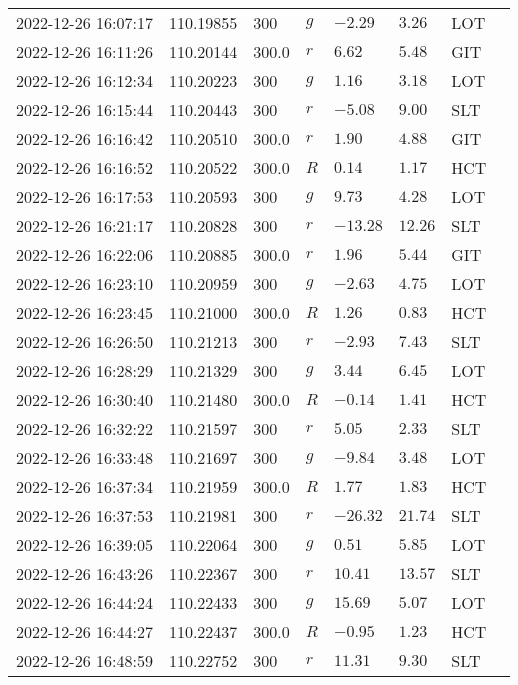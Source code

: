 \documentclass{nature_plusfigure}
\begin{document}
\begin{supplement}
\begin{center}
\begin{longtable}{llllllll}
2022-12-26 16:07:17 & 110.19855 & 300 & $g$ & $-2.29$ & $3.26$ & LOT &  \\ 
2022-12-26 16:11:26 & 110.20144 & 300.0 & $r$ & $6.62$ & $5.48$ & GIT &  \\ 
2022-12-26 16:12:34 & 110.20223 & 300 & $g$ & $1.16$ & $3.18$ & LOT &  \\ 
2022-12-26 16:15:44 & 110.20443 & 300 & $r$ & $-5.08$ & $9.00$ & SLT &  \\ 
2022-12-26 16:16:42 & 110.20510 & 300.0 & $r$ & $1.90$ & $4.88$ & GIT &  \\ 
2022-12-26 16:16:52 & 110.20522 & 300.0 & $R$ & $0.14$ & $1.17$ & HCT &  \\ 
2022-12-26 16:17:53 & 110.20593 & 300 & $g$ & $9.73$ & $4.28$ & LOT &  \\ 
2022-12-26 16:21:17 & 110.20828 & 300 & $r$ & $-13.28$ & $12.26$ & SLT &  \\ 
2022-12-26 16:22:06 & 110.20885 & 300.0 & $r$ & $1.96$ & $5.44$ & GIT &  \\ 
2022-12-26 16:23:10 & 110.20959 & 300 & $g$ & $-2.63$ & $4.75$ & LOT &  \\ 
2022-12-26 16:23:45 & 110.21000 & 300.0 & $R$ & $1.26$ & $0.83$ & HCT &  \\ 
2022-12-26 16:26:50 & 110.21213 & 300 & $r$ & $-2.93$ & $7.43$ & SLT &  \\ 
2022-12-26 16:28:29 & 110.21329 & 300 & $g$ & $3.44$ & $6.45$ & LOT &  \\ 
2022-12-26 16:30:40 & 110.21480 & 300.0 & $R$ & $-0.14$ & $1.41$ & HCT &  \\ 
2022-12-26 16:32:22 & 110.21597 & 300 & $r$ & $5.05$ & $2.33$ & SLT &  \\ 
2022-12-26 16:33:48 & 110.21697 & 300 & $g$ & $-9.84$ & $3.48$ & LOT &  \\ 
2022-12-26 16:37:34 & 110.21959 & 300.0 & $R$ & $1.77$ & $1.83$ & HCT &  \\ 
2022-12-26 16:37:53 & 110.21981 & 300 & $r$ & $-26.32$ & $21.74$ & SLT &  \\ 
2022-12-26 16:39:05 & 110.22064 & 300 & $g$ & $0.51$ & $5.85$ & LOT &  \\ 
2022-12-26 16:43:26 & 110.22367 & 300 & $r$ & $10.41$ & $13.57$ & SLT &  \\ 
2022-12-26 16:44:24 & 110.22433 & 300 & $g$ & $15.69$ & $5.07$ & LOT &  \\ 
2022-12-26 16:44:27 & 110.22437 & 300.0 & $R$ & $-0.95$ & $1.23$ & HCT &  \\ 
2022-12-26 16:48:59 & 110.22752 & 300 & $r$ & $11.31$ & $9.30$ & SLT &  \\ 

\end{longtable}
\end{center}
\end{supplement}
\end{document}
